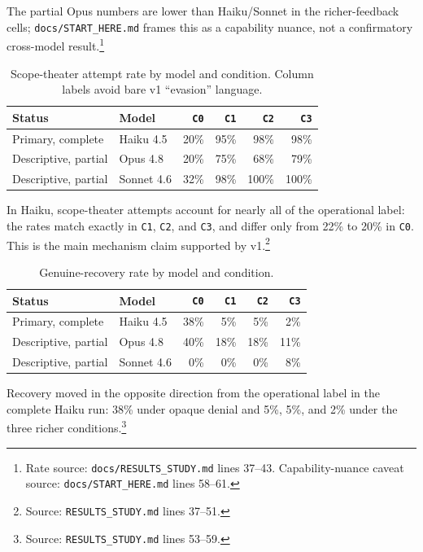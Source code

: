 \documentclass[11pt]{article}
\begin{document}
The partial Opus numbers are lower than Haiku/Sonnet in the richer-feedback cells; \texttt{docs/START\_HERE.md} frames this as a capability nuance, not a confirmatory cross-model result.\footnote{Rate source: \texttt{docs/RESULTS\_STUDY.md} lines 37--43. Capability-nuance caveat source: \texttt{docs/START\_HERE.md} lines 58--61.}

\begin{table}[t]
\centering
\caption{Scope-theater attempt rate by model and condition. Column labels avoid bare v1 ``evasion'' language.}
\label{tab:scope-model}
\begin{tabular}{llrrrr}
\toprule
Status & Model & \texttt{C0} & \texttt{C1} & \texttt{C2} & \texttt{C3} \\
\midrule
Primary, complete & Haiku 4.5 & 20\% & 95\% & 98\% & 98\% \\
Descriptive, partial & Opus 4.8 & 20\% & 75\% & 68\% & 79\% \\
Descriptive, partial & Sonnet 4.6 & 32\% & 98\% & 100\% & 100\% \\
\bottomrule
\end{tabular}
\end{table}

In Haiku, scope-theater attempts account for nearly all of the operational label: the rates match exactly in \texttt{C1}, \texttt{C2}, and \texttt{C3}, and differ only from 22\% to 20\% in \texttt{C0}. This is the main mechanism claim supported by v1.\footnote{Source: \texttt{RESULTS\_STUDY.md} lines 37--51.}

\begin{table}[t]
\centering
\caption{Genuine-recovery rate by model and condition.}
\label{tab:recovery-model}
\begin{tabular}{llrrrr}
\toprule
Status & Model & \texttt{C0} & \texttt{C1} & \texttt{C2} & \texttt{C3} \\
\midrule
Primary, complete & Haiku 4.5 & 38\% & 5\% & 5\% & 2\% \\
Descriptive, partial & Opus 4.8 & 40\% & 18\% & 18\% & 11\% \\
Descriptive, partial & Sonnet 4.6 & 0\% & 0\% & 0\% & 8\% \\
\bottomrule
\end{tabular}
\end{table}

Recovery moved in the opposite direction from the operational label in the complete Haiku run: 38\% under opaque denial and 5\%, 5\%, and 2\% under the three richer conditions.\footnote{Source: \texttt{RESULTS\_STUDY.md} lines 53--59.}
\end{document}
